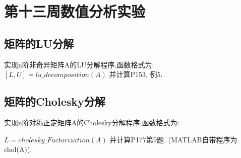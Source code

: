 \section{第十三周数值分析实验}
\subsection{矩阵的LU分解}
\begin{ex}
	实现n阶非奇异矩阵A的LU分解程序,函数格式为:
	$[L,U]=lu\_decomposition(A)$
	并计算P153, 例5.
\end{ex}


\subsection{矩阵的Cholesky分解}
\begin{ex}
	实现n阶对称正定矩阵A的Cholesky分解程序,函数格式为:
	
	$L=cholesky\_Factorization (A)$
	并计算P177第9题. (MATLAB自带程序为chol(A)).
\end{ex}

